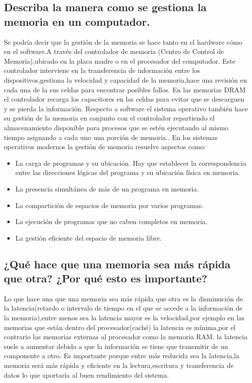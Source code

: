 \documentclass{article}
\begin{document}
\subsection{Describa la manera como se gestiona la memoria en un computador.}
Se podría decir que la gestión  de la memoria se hace tanto en el hardware cómo en el software.A través del controlador de memoria (Centro de Control de Memoria),ubicado en la placa madre o en el procesador del computador.
Este controlador interviene en la transferencia de información entre los dispositivos,gestiona la velocidad y capacidad de la memoria,hace una revisión en cada una de la sus celdas para encontrar posibles fallos.
En las memorias DRAM el controlador recarga los capacitores en las celdas para evitar que se descarguen y se pierda la información\cite{ref2}.
Respecto a software el sistema operativo también  hace su gestión de la memoria en conjunto con el controlador repartiendo el almacenamiento disponible para procesos que se estén ejecutando al mismo tiempo asignando a cada uno una porción de memoria.\cite{gm}.\newline
 En los sistemas operativos modernos la
gestión de memoria resuelve aspectos como:
\begin{itemize}
    \item {La carga de programas y su ubicación. Hay que establecer la correspondencia
entre las direcciones lógicas del programa y su ubicación física en memoria.}
\item{ La presencia simultánea de más de un programa en memoria.}

\item{ La compartición de espacios de memoria por varios programas.}

\item{ La ejecución de programas que no caben completos en memoria.}
\item{ La gestión eficiente del espacio de memoria libre}\cite{gestion}.
\end{itemize}







\subsection{¿Qué hace que una memoria sea más rápida que otra? ¿Por qué esto es importante?}

Lo que hace una que una memoria sea más rápida que otra es la disminución de la latencia(retardo o intervalo de tiempo en el que se  accede a la información de la memoria),entre menos sea la latencia mayor es la velocidad,por ejemplo en las memorias que están dentro del procesador(caché) la latencia es mínima,por el contrario las memorias externas al  procesador como la memoria RAM,  la latencia suele a aumentar debido a que  la información se tiene que transmitir de un componente a otro. 
Es importante  porque entre más reducida sea la latencia,la memoria será más rápida y eficiente en la lectura,escritura y transferencia de datos lo que aportaría al buen rendimiento del sistema.\newpage
\end{document}

